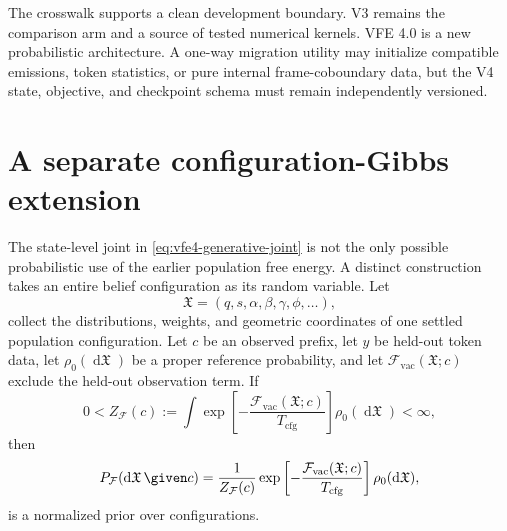 The crosswalk supports a clean development boundary. V3 remains the comparison arm and a source of tested numerical kernels. VFE 4.0 is a new probabilistic architecture. A one-way migration utility may initialize compatible emissions, token statistics, or pure internal frame-coboundary data, but the V4 state, objective, and checkpoint schema must remain independently versioned.

\section{A separate configuration-Gibbs extension}

The state-level joint in \cref{eq:vfe4-generative-joint} is not the only possible probabilistic use of the earlier population free energy. A distinct construction takes an entire belief configuration as its random variable. Let
\begin{equation}
\mathfrak X
=
(q,s,\alpha,\beta,\gamma,\phi,\ldots),
\label{eq:configuration-gibbs-random-variable}
\end{equation}
collect the distributions, weights, and geometric coordinates of one settled population configuration. Let $c$ be an observed prefix, let $y$ be held-out token data, let $\rho_0(\mathop{\mathrm d\mathfrak X})$ be a proper reference probability, and let $\mathcal F_{\mathrm{vac}}(\mathfrak X;c)$ exclude the held-out observation term. If
\begin{equation}
0<Z_{\mathcal F}(c)
:=
\int
\exp\left[-\frac{\mathcal F_{\mathrm{vac}}(\mathfrak X;c)}{T_{\mathrm{cfg}}}\right]
\rho_0(\mathop{\mathrm d\mathfrak X})
<\infty,
\label{eq:configuration-gibbs-partition}
\end{equation}
then
\begin{equation}
P_{\mathcal F}(\mathop{\mathrm d\mathfrak X}\given c)
=
\frac{1}{Z_{\mathcal F}(c)}
\exp\left[-\frac{\mathcal F_{\mathrm{vac}}(\mathfrak X;c)}{T_{\mathrm{cfg}}}\right]
\rho_0(\mathop{\mathrm d\mathfrak X}),
\label{eq:configuration-gibbs-prior}
\end{equation}
is a normalized prior over configurations.

